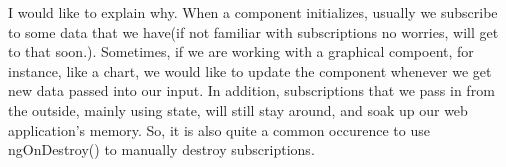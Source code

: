 I would like to explain why. When a component initializes, usually we subscribe
to some data that we have(if not familiar with subscriptions no worries, will
get to that soon.). Sometimes, if we are working with a graphical compoent, for
instance, like a chart, we would like to update the component whenever we get
new data passed into our input. In addition, subscriptions that we pass in from
the outside, mainly using state, will still stay around, and soak up our web
application's memory. So, it is also quite a common occurence to use ngOnDestroy()
to manually destroy subscriptions.
